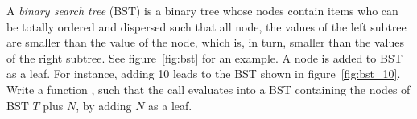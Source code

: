 A \emph{binary search tree} (BST) is a binary tree whose nodes contain
items who can be totally ordered and dispersed such that all node, the
values of the left subtree are smaller than the value of the node,
which is, in turn, smaller than the values of the right subtree. See
figure~\ref{fig:bst} for an example.
A node is added to BST as a leaf. For instance, adding 10 leads to the
BST shown in figure~\ref{fig:bst_10}.
Write a function , such that the call
 evaluates into a BST containing the nodes
of BST \(T\) plus \(N\), by adding \(N\) as a leaf.
\begin{figure}[!h]
\centering
{}
\qquad
{}
\end{figure}
